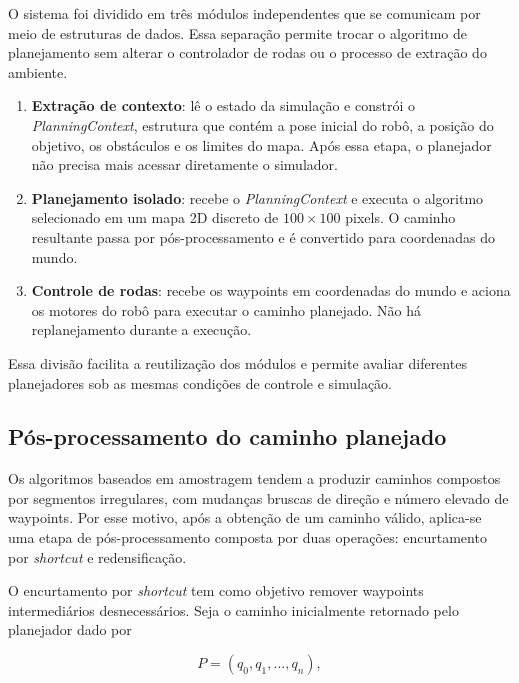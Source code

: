 O sistema foi dividido em três módulos independentes que se comunicam por meio de estruturas de dados. Essa separação permite trocar o algoritmo de planejamento sem alterar o controlador de rodas ou o processo de extração do ambiente.

\begin{enumerate}
    \item \textbf{Extração de contexto}: lê o estado da simulação e constrói o \emph{PlanningContext}, estrutura que contém a pose inicial do robô, a posição do objetivo, os obstáculos e os limites do mapa. Após essa etapa, o planejador não precisa mais acessar diretamente o simulador.

    \item \textbf{Planejamento isolado}: recebe o \emph{PlanningContext} e executa o algoritmo selecionado em um mapa 2D discreto de $100 \times 100$ pixels. O caminho resultante passa por pós-processamento e é convertido para coordenadas do mundo.

    \item \textbf{Controle de rodas}: recebe os waypoints em coordenadas do mundo e aciona os motores do robô para executar o caminho planejado. Não há replanejamento durante a execução.
\end{enumerate}

Essa divisão facilita a reutilização dos módulos e permite avaliar diferentes planejadores sob as mesmas condições de controle e simulação.

\subsection{Pós-processamento do caminho planejado}
\label{subsec:pos_processamento}

Os algoritmos baseados em amostragem tendem a produzir caminhos compostos por segmentos irregulares, com mudanças bruscas de direção e número elevado de waypoints. Por esse motivo, após a obtenção de um caminho válido, aplica-se uma etapa de pós-processamento composta por duas operações: encurtamento por \textit{shortcut} e redensificação.

O encurtamento por \textit{shortcut} tem como objetivo remover waypoints intermediários desnecessários. Seja o caminho inicialmente retornado pelo planejador dado por

\begin{equation}
    P = (q_0, q_1, \ldots, q_n),
    \label{eq:caminho_original}
\end{equation}

